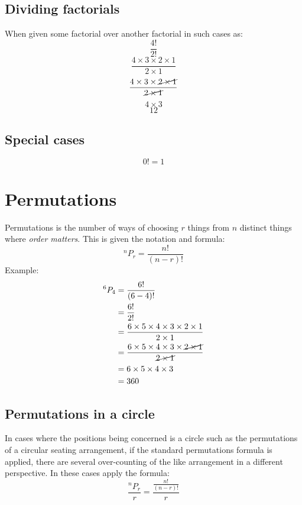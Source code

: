 \documentclass[a4paper,10pt]{report}
\begin{document}
\subsection{Dividing factorials}
When given some factorial over another factorial in such cases as:
$$\frac{4!}{2!}$$
$$\frac{4 \times 3 \times 2 \times 1}{2 \times 1}$$
$$\frac{4 \times 3 \times \cancel{2 \times 1}}{\cancel{2 \times 1}}$$
$$4 \times 3$$
$$12$$

\subsection{Special cases}
$$0! = 1$$

\section{Permutations}
Permutations is the number of ways of choosing $r$ things from $n$ distinct things where \emph{order matters}.  This is given the notation and formula:
$$
	^nP_r = \frac{n!}{(n-r)!}
$$
Example:\\
\begin{align*}
	^6P_4 & = \frac{6!}{(6 - 4)!}                                                                 \\
	      & = \frac{6!}{2!}                                                                       \\
	      & = \frac{6 \times 5 \times 4 \times 3 \times 2 \times 1}{2 \times 1}                   \\
	      & = \frac{6 \times 5 \times 4 \times 3 \times \cancel{2 \times 1}}{\cancel{2 \times 1}} \\
	      & = 6 \times 5 \times 4 \times 3                                                        \\
	      & = 360
\end{align*}

\subsection{Permutations in a circle}
In cases where the positions being concerned is a circle such as the permutations of a circular seating arrangement, if the standard permutations formula is applied, there are several over-counting of the like arrangement in a different perspective.  In these cases apply the formula:
$$
	\frac{^nP_r}{r} = \frac{\frac{n!}{(n-r)!}}{r}
$$
\end{document}
